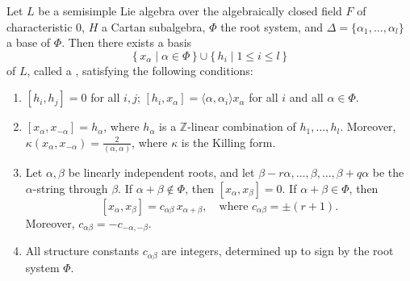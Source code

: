 Let $L$ be a semisimple Lie algebra over the algebraically closed field $F$ of characteristic $0$, $H$ a Cartan subalgebra, $\Phi$ the root system, and $\Delta = \{\alpha_1, \ldots, \alpha_l\}$ a base of $\Phi$. Then there exists a basis
$$\{\, x_\alpha \mid \alpha \in \Phi \,\} \cup \{\, h_i \mid 1 \leq i \leq l \,\}$$
of $L$, called a , satisfying the following conditions:

\begin{enumerate}
\item[(a)] $[h_i, h_j] = 0$ for all $i, j$; $[h_i, x_\alpha] = \langle \alpha, \alpha_i \rangle x_\alpha$ for all $i$ and all $\alpha \in \Phi$.

\item[(b)] $[x_\alpha, x_{-\alpha}] = h_\alpha$, where $h_\alpha$ is a $\mathbb{Z}$-linear combination of $h_1, \ldots, h_l$. Moreover, $\kappa(x_\alpha, x_{-\alpha}) = \frac{2}{(\alpha, \alpha)}$, where $\kappa$ is the Killing form.

\item[(c)] Let $\alpha, \beta$ be linearly independent roots, and let $\beta - r\alpha, \ldots, \beta, \ldots, \beta + q\alpha$ be the $\alpha$-string through $\beta$. If $\alpha + \beta \notin \Phi$, then $[x_\alpha, x_\beta] = 0$. If $\alpha + \beta \in \Phi$, then
$$[x_\alpha, x_\beta] = c_{\alpha\beta}\, x_{\alpha+\beta}, \quad \text{where } c_{\alpha\beta} = \pm(r+1).$$
Moreover, $c_{\alpha\beta} = -c_{-\alpha, -\beta}$.

\item[(d)] All structure constants $c_{\alpha\beta}$ are integers, determined up to sign by the root system $\Phi$.
\end{enumerate}
